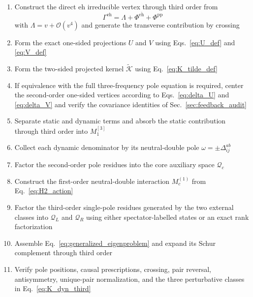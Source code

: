 \documentclass[aip,jcp,reprint,noshowkeys,superscriptaddress]{revtex4-1}
\newcommand{\eh}{\text{eh}}
\newcommand{\teh}{\overline{\text{eh}}}
\newcommand{\pp}{\text{pp}}
\begin{document}
\begin{enumerate}
	\item Construct the direct $\eh$ irreducible vertex through third order from
	\begin{equation}
		\Gamma^\eh
		=
		\Lambda
		+
		\Phi^{\teh}
		+
		\Phi^\pp
	\end{equation}
	with $\Lambda=v+\mathcal O(v^4)$ and generate the transverse contribution by crossing

	\item Form the exact one-sided projections $U$ and $V$ using Eqs.~\eqref{eq:U_def} and \eqref{eq:V_def}

	\item Form the two-sided projected kernel $\widetilde{\mathcal K}$ using Eq.~\eqref{eq:K_tilde_def}

	\item If equivalence with the full three-frequency pole equation is required, center the second-order one-sided vertices according to Eqs.~\eqref{eq:delta_U} and \eqref{eq:delta_V} and verify the covariance identities of Sec.~\ref{sec:feedback_audit}

	\item Separate static and dynamic terms and absorb the static contribution through third order into $M_1^{[3]}$

	\item Collect each dynamic denominator by its neutral-double pole $\omega=\pm\Delta_{ij}^{ab}$

	\item Factor the second-order pole residues into the core auxiliary space $\mathcal Q_c$

	\item Construct the first-order neutral-double interaction $M_c^{(1)}$ from Eq.~\eqref{eq:H2_action}

	\item Factor the third-order single-pole residues generated by the two external classes into $\mathcal Q_L$ and $\mathcal Q_R$ using either spectator-labelled states or an exact rank factorization

	\item Assemble Eq.~\eqref{eq:generalized_eigenproblem} and expand its Schur complement through third order

	\item Verify pole positions, causal prescriptions, crossing, pair reversal, antisymmetry, unique-pair normalization, and the three perturbative classes in Eq.~\eqref{eq:K_dyn_third}
\end{enumerate}
\end{document}
